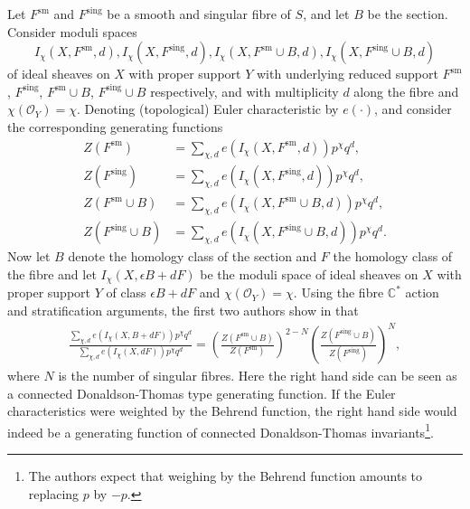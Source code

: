 \documentclass{amsart}
\theoremstyle{definition}
\newcommand{\CC} {\mathbb{C}}          %
\renewcommand{\O}{\mathcal{O}}
\newcommand{\sm}{\mathrm{sm}}
\newcommand{\sing}{\mathrm{sing}}
\begin{document}
Let $F^{\sm}$ and $F^{\sing}$ be a smooth and singular fibre of $S$, and let $B$ be the section. Consider moduli spaces 
$$
I_\chi(X,F^{\sm},d), I_\chi(X,F^{\sing},d), I_\chi(X,F^{\sm} \cup B,d), I_\chi(X,F^{\sing} \cup B,d) 
$$
of ideal sheaves on $X$ with proper support $Y$ with underlying reduced support $F^{\sm}$, $F^{\sing}$, $F^{\sm} \cup B$, $F^{\sing} \cup B$ respectively, and with multiplicity $d$ along the fibre and $\chi(\O_Y) = \chi$. Denoting (topological) Euler characteristic by $e(\cdot)$, and consider the corresponding generating functions
\begin{align*}
Z(F^{\sm}) &= \sum_{\chi, d} e(I_\chi(X,F^{\sm},d)) p^\chi q^d, \\
Z(F^{\sing}) &= \sum_{\chi, d} e(I_\chi(X,F^{\sing},d)) p^\chi q^d, \\
Z(F^{\sm} \cup B) &= \sum_{\chi, d} e(I_\chi(X,F^{\sm} \cup B,d)) p^\chi q^d, \\
Z(F^{\sing} \cup B) &= \sum_{\chi, d} e(I_\chi(X,F^{\sing} \cup B,d)) p^\chi q^d.
\end{align*}
Now let $B$ denote the homology class of the section and $F$ the homology class of the fibre and let $I_\chi(X,\epsilon B+dF)$ be the moduli space of ideal sheaves on $X$ with proper support $Y$ of class $\epsilon B+dF$ and $\chi(\O_Y) = \chi$. Using the fibre $\CC^*$ action and stratification arguments, the first two authors show in \cite{BK} that 
\begin{align*}
\frac{\sum_{\chi, d} e(I_\chi(X,B+dF)) p^\chi q^d}{\sum_{\chi, d} e(I_\chi(X,dF)) p^\chi q^d} = \left( \frac{Z(F^{\sm} \cup B)}{Z(F^{\sm})} \right)^{2-N} \left( \frac{Z(F^{\sing} \cup B)}{Z(F^{\sing})} \right)^N,
\end{align*}
where $N$ is the number of singular fibres. Here the right hand side can be seen as a connected Donaldson-Thomas type generating function. If the Euler characteristics were weighted by the Behrend function, the right hand side would indeed be a generating function of connected Donaldson-Thomas invariants\footnote{The authors expect that weighing by the Behrend function amounts to replacing $p$ by $-p$.}. 
\end{document}
